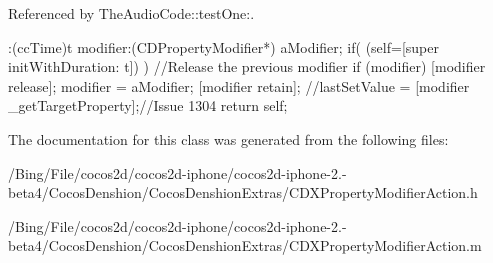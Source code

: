 Referenced by The\-Audio\-Code\-::test\-One\-:.


\begin{DoxyCode}
                      :(ccTime)t modifier:(CDPropertyModifier*) aModifier;
{
        if( (self=[super initWithDuration: t]) ) {
                //Release the previous modifier
                if (modifier) {
                        [modifier release];
                }
                modifier = aModifier;
                [modifier retain];
                //lastSetValue = [modifier _getTargetProperty];//Issue 1304
        }
        return self;
}
\end{DoxyCode}


The documentation for this class was generated from the following files\-:\begin{DoxyCompactItemize}
\item 
/\-Bing/\-File/cocos2d/cocos2d-\/iphone/cocos2d-\/iphone-\/2.-\/beta4/\-Cocos\-Denshion/\-Cocos\-Denshion\-Extras/C\-D\-X\-Property\-Modifier\-Action.\-h\item 
/\-Bing/\-File/cocos2d/cocos2d-\/iphone/cocos2d-\/iphone-\/2.-\/beta4/\-Cocos\-Denshion/\-Cocos\-Denshion\-Extras/C\-D\-X\-Property\-Modifier\-Action.\-m\end{DoxyCompactItemize}
